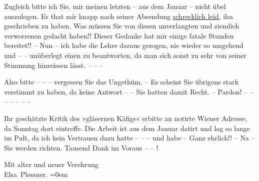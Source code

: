 \pstart
           Zugleich bitte ich Sie, mir meinen letzten \label{K_L03732-2v}\label{K_L03732-2} – aus dem
                  Januar – nicht übel auszulegen. Es that mir knapp nach seiner
               Absendung \uline{schrecklich leid}, ihn geschrieben zu haben.
               Was müssen Sie von diesen unverlangten und ziemlich verworrenen \label{K_L03732-3v}\label{K_L03732-3} gedacht
               haben!! Dieser Gedanke hat mir einige fatale Stunden bereitet!! – Nun – ich habe die
               Lehre daraus gezogen, nie wieder so umgehend und – – unüberlegt einen \label{K_L03732-4v}\label{K_L03732-4} zu beant{\pb}worten, da man sich
               sonst zu sehr von seiner Stimmung hinreissen lässt. – – –\pend
           
\pstart
           Also bitte – – – vergessen Sie das Ungethüm. – Es scheint Sie
               übrigens stark verstimmt zu haben, da keine Antwort – – Sie hatten damit Recht. –
               Pardon! – – – – – – –\pend
           
\pstart
           Ihr geschätzte Kritik des »gläsernen Käfigs«
               erbitte an notirte Wiener Adresse, da
                  Sonntag dort eintreffe. Die Arbeit ist aus dem Januar datirt und lag so
               lange im Pult, da ich kein Vertrauen dazu hatte – – – und habe – Ganz ehrlich!! – Na
               – Sie werden richten. Tausend Dank im Voraus – – !\pend
           
\pstart
           Mit alter und neuer Verehrung{\\[\baselineskip]}\spacefill\mbox{Elsa Plessner.}\pend
           \leftskip=0em{}\endnumbering{}  \newcommand{\dateiname}{L03732}\newcommand{\titel}{Elsa Plessner an Arthur Schnitzler, 18. 3. 1897}\newcommand{\editorInnen}{Selma Jahnke und Martin Anton Müller}

